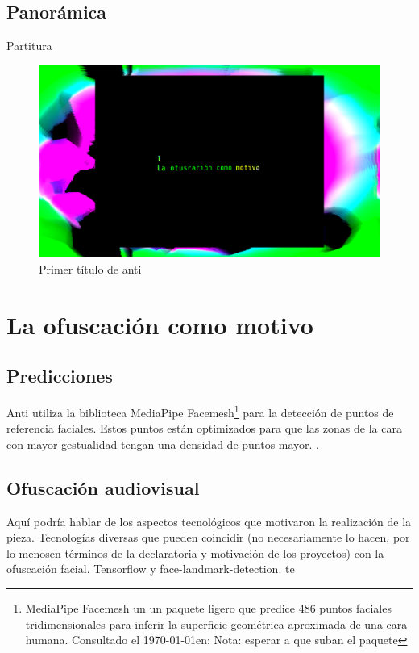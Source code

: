 \subsection{Panorámica}

Partitura

\begin{figure}[tb]
\centering 
\includegraphics[width=\columnwidth]{../../img/antiHydra1.png} 
\caption[Título 1]{Primer título de anti}
\label{fig:gallery} 
\end{figure}

\section{La ofuscación como motivo}

\subsection{Predicciones}

Anti utiliza la biblioteca MediaPipe Facemesh\footnote{MediaPipe Facemesh un un paquete ligero que predice 486 puntos faciales tridimensionales para inferir la superficie geométrica aproximada de una cara humana. Consultado el \today en: Nota: esperar a que suban el paquete} para la detección de puntos de referencia faciales. Estos puntos están optimizados para que las zonas de la cara con mayor gestualidad tengan una densidad de puntos mayor. \citep{kartynnik2019realtime}.

\subsection{Ofuscación audiovisual}

Aquí podría hablar de los aspectos tecnológicos que motivaron la realización de la pieza. Tecnologías diversas que pueden coincidir (no necesariamente lo hacen, por lo menosen términos de la declaratoria y motivación de los proyectos) con la ofuscación facial. Tensorflow y face-landmark-detection. 
te

